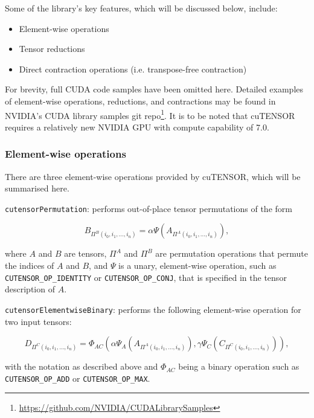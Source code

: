 \documentclass[12pt]{article}
\begin{document}
\noindent Some of the library's key features, which will be discussed below, include:

\begin{itemize}
\item Element-wise operations
\item Tensor reductions
\item Direct contraction operations (i.e. transpose-free contraction)
\end{itemize}

\noindent For brevity, full CUDA code samples have been omitted here. Detailed examples of element-wise operations, reductions, and contractions may be found in NVIDIA's CUDA library samples git repo\footnote{\url{https://github.com/NVIDIA/CUDALibrarySamples}}. It is to be noted that cuTENSOR requires a relatively new NVIDIA GPU with compute capability of 7.0.


\subsubsection{Element-wise operations} \label{cutensor::elementwise}
There are three element-wise operations provided by cuTENSOR, which will be summarised here.

\vspace{0.5em}\texttt{cutensorPermutation}: performs out-of-place tensor permutations of the form

\begin{equation*} 
B_{\Pi^B(i_0,i_1,...,i_n)} = \alpha\Psi(A_{\Pi^A(i_0,i_1,...,i_n)}),
\end{equation*}

\noindent where $A$ and $B$ are tensors, $\Pi^A$ and $\Pi^B$ are permutation operations that permute the indices of $A$ and $B$, and $\Psi$ is a unary, element-wise operation, such as \texttt{CUTENSOR\_OP\_IDENTITY} or \texttt{CUTENSOR\_OP\_CONJ}, that is specified in the tensor description of $A$.

\vspace{0.5em}\texttt{cutensorElementwiseBinary}: performs the following element-wise operation for two input tensors:

\begin{equation*}
D_{\Pi^C(i_0,i_1,...,i_n)} = \Phi_{AC}(\alpha\Psi_A(A_{\Pi^A(i_0,i_1,...,i_n)}), \gamma\Psi_C(C_{\Pi^C(i_0,i_1,...,i_n)})),
\end{equation*}

\noindent with the notation as described above and $\Phi_{AC}$ being a binary operation such as \texttt{CUTENSOR\_OP\_ADD} or \texttt{CUTENSOR\_OP\_MAX}.
\end{document}
